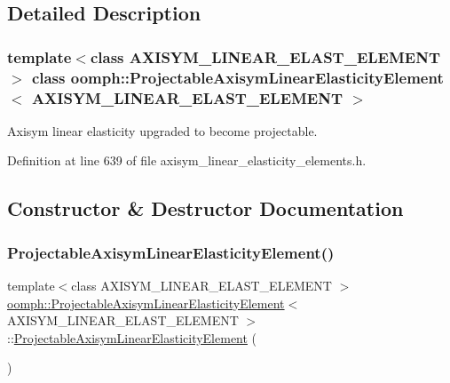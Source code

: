 \subsection{Detailed Description}
\subsubsection*{template$<$class A\+X\+I\+S\+Y\+M\+\_\+\+L\+I\+N\+E\+A\+R\+\_\+\+E\+L\+A\+S\+T\+\_\+\+E\+L\+E\+M\+E\+NT$>$\newline
class oomph\+::\+Projectable\+Axisym\+Linear\+Elasticity\+Element$<$ A\+X\+I\+S\+Y\+M\+\_\+\+L\+I\+N\+E\+A\+R\+\_\+\+E\+L\+A\+S\+T\+\_\+\+E\+L\+E\+M\+E\+N\+T $>$}

Axisym linear elasticity upgraded to become projectable. 

Definition at line 639 of file axisym\+\_\+linear\+\_\+elasticity\+\_\+elements.\+h.



\subsection{Constructor \& Destructor Documentation}
\mbox{\label{classoomph_1_1ProjectableAxisymLinearElasticityElement_a766f5fc9a53b9eb9e385021c5673e531}} 
\subsubsection{\texorpdfstring{Projectable\+Axisym\+Linear\+Elasticity\+Element()}{ProjectableAxisymLinearElasticityElement()}}
{\footnotesize\ttfamily template$<$class A\+X\+I\+S\+Y\+M\+\_\+\+L\+I\+N\+E\+A\+R\+\_\+\+E\+L\+A\+S\+T\+\_\+\+E\+L\+E\+M\+E\+NT $>$ \\
\hyperlink{classoomph_1_1ProjectableAxisymLinearElasticityElement}{oomph\+::\+Projectable\+Axisym\+Linear\+Elasticity\+Element}$<$ A\+X\+I\+S\+Y\+M\+\_\+\+L\+I\+N\+E\+A\+R\+\_\+\+E\+L\+A\+S\+T\+\_\+\+E\+L\+E\+M\+E\+NT $>$\+::\hyperlink{classoomph_1_1ProjectableAxisymLinearElasticityElement}{Projectable\+Axisym\+Linear\+Elasticity\+Element} (\begin{DoxyParamCaption}{ }\end{DoxyParamCaption})\hspace{0.3cm}{\ttfamily [inline]}}



